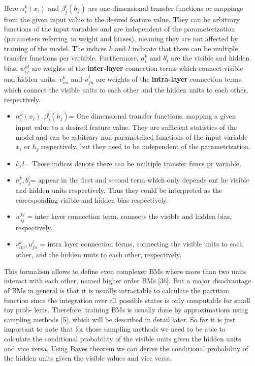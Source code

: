 Here $\alpha_i^k (x_i)$ and $\beta_j^l (h_j)$ are one-dimensional
transfer functions or mappings from the given input value to the
desired feature value. They can be arbitrary functions of the input
variables and are independent of the parameterization (parameters
referring to weight and biases), meaning they are not affected by
training of the model. The indices $k$ and $l$ indicate that there can
be multiple transfer functions per variable.  Furthermore, $a_i^k$ and
$b_j^l$ are the visible and hidden bias. $w_{ij}^{kl}$ are weights of
the \textbf{inter-layer} connection terms which connect visible and
hidden units. $ v_{im}^k$ and $u_{jn}^l$ are weights of the
\textbf{intra-layer} connection terms which connect the visible units
to each other and the hidden units to each other, respectively.

\begin{itemize}
	\item $\alpha_i^k (x_i), \beta_j^l (h_j) $= One dimensional transfer functions, mapping a given input value to a desired feature value. They are sufficient statistics of the model and can be arbitrary non-parametrized functions of the input variable $x_i$ or $h_j$ respectively, but they need to be independent of the parametrization.
	\item $k, l $= These indices denote there can be multiple transfer funcs pr variable.
	\item $a_i^k,  b_j^l$= appear in the first and second term which only depends ont he visible and hidden units respectively. Thus they could be interpreted as the corresponding visible and hidden bias respectively.
	\item $w_{ij}^{kl}$ = inter layer connection term, connects the visible and hidden bias, respectively.
	\item $ v_{im}^k, u_{jn}^l$ = intra layer connection terms, connecting the visible units to each other, and the hidden units to each other, respectively.
\end{itemize}


This formalism allows to define even complexer BMs where more than two
units interact with each other, named higher order BMs [36]. But a
major disadvantage of BMs in general is that it is usually intractable
to calculate the partition function since the integration over all
possible states is only computable for small toy prob- lems.
Therefore, training BMs is usually done by approximations using
sampling methods [5], which will be described in detail later. So far
it is just important to note that for those sampling methods we need
to be able to calculate the conditional probability of the visible
units given the hidden units and vice versa. Using Bayes theorem we
can derive the conditional probability of the hidden units given the
visible values and vice versa.




